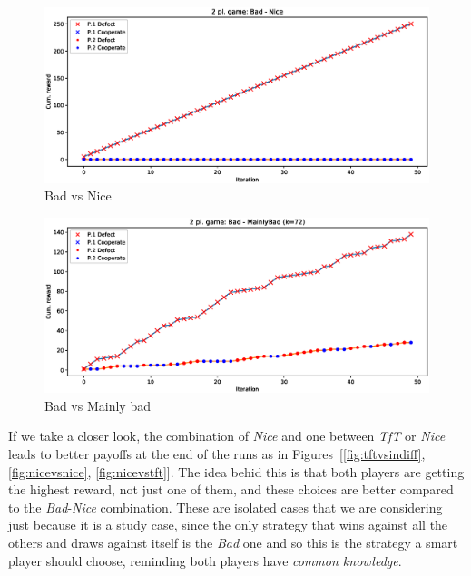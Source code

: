 \documentclass[journal,a4paper,10pt,twoside]{IEEEtran} %
\begin{document}
\begin{figure}[!ht]
    \centering
    \includegraphics[width=1\columnwidth]{../img/ipd2p/ipd2p-rewards-Bad-Nice}
    \caption{Bad vs Nice}
    \label{fig:badvsnice}
\end{figure}

\begin{figure}[!ht]
    \centering
    \includegraphics[width=1\columnwidth]{../img/ipd2p/ipd2p-rewards-Bad-MainlyBad(k=72)}
    \caption{Bad vs Mainly bad}
    \label{fig:badvsmainlybad}
\end{figure}

If we take a closer look, the combination of \textit{Nice} and one between \textit{TfT} or \textit{Nice} leads to better payoffs at the end of the runs as in Figures~[\ref{fig:tftvsindiff}, \ref{fig:nicevsnice}, \ref{fig:nicevstft}]. The idea behid this is that both players are getting the highest reward, not just one of them, and these choices are better compared to the \textit{Bad}-\textit{Nice} combination. These are isolated cases that we are considering just because it is a study case, since the only strategy that wins against all the others and draws against itself is the \textit{Bad} one and so this is the strategy a smart player should choose, reminding both players have \textit{common knowledge}.
\end{document}
